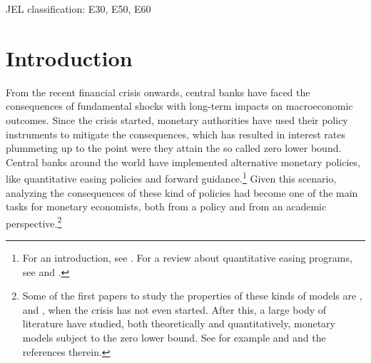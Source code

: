 \documentclass[11pt]{article}
\numberwithin{equation}{section}
\begin{document}
JEL classification: E30, E50, E60
	
\section{Introduction}\label{sec:introduction}

From the recent financial crisis onwards, central banks have faced the consequences of fundamental shocks with long-term impacts on macroeconomic outcomes. Since the crisis started, monetary authorities have used their policy instruments to mitigate the consequences, which has resulted in interest rates plummeting up to the point were they attain the so called zero lower bound. Central banks around the world have implemented alternative monetary policies, like quantitative easing policies and forward guidance.\footnote{For an introduction, see \cite{BorioEtAl2016}. For a review about quantitative easing programs, see \cite{ChenEtAl2012} and \cite{JoyceEtAl2012}.} Given this scenario, analyzing the consequences of these kind of policies had become one of the main tasks for monetary economists, both from a policy and from an academic perspective.\footnote{Some of the first papers to study the properties of these kinds of models are \cite{BenhabibEtAl2001,BenhabibEtAl2001a,BenhabibEtAl2002}, \cite{EggertssonEtAl2003} and \cite{AdamEtAl2007}, when the crisis has not even started. After this, a large body of literature have studied, both theoretically and quantitatively, monetary models subject to the zero lower bound. See for example \cite{Fernandez-VillaverdeEtAl2015} and \cite{AruobaEtAl2016} and the references therein.}
\end{document}
